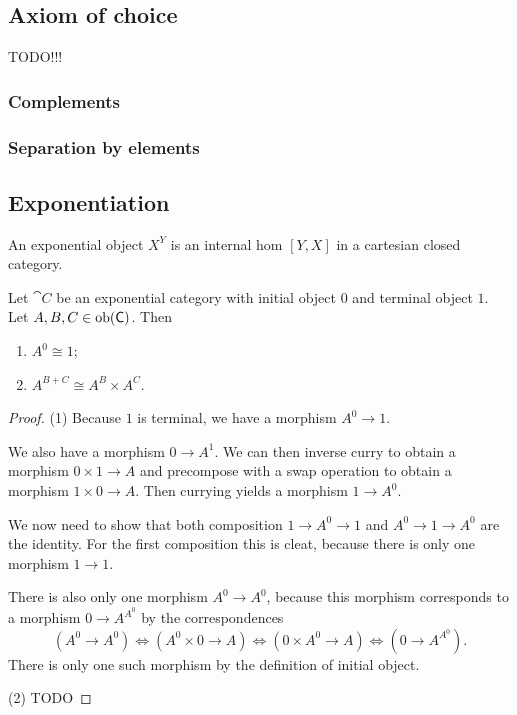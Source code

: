 \subsection{Axiom of choice}
TODO!!!
\subsubsection{Complements}
\subsubsection{Separation by elements}

\subsection{Exponentiation}
\begin{definition}
An exponential object $X^Y$ is an internal hom $[Y,X]$ in a cartesian closed category.
\end{definition}

\begin{proposition}
Let $\cat{C}$ be an exponential category with initial object $0$ and terminal object $1$. Let $A,B,C\in \operatorname{ob}(\mathsf{C})$. Then
\begin{enumerate}
\item $A^0 \cong 1$;
\item $A^{B + C} \cong A^B \times A^C$.
\end{enumerate}
\end{proposition}
\begin{proof}
(1) Because $1$ is terminal, we have a morphism $A^0\to 1$.

We also have a morphism $0 \to A^1$. We can then inverse curry to obtain a morphism $0\times 1 \to A$ and precompose with a swap operation to obtain a morphism $1\times 0 \to A$. Then currying yields a morphism $1 \to A^0$.

We now need to show that both composition $1\to A^0 \to 1$ and $A^0\to 1 \to A^0$ are the identity. For the first composition this is cleat, because there is only one morphism $1\to 1$.

There is also only one morphism $A^0\to A^0$, because this morphism corresponds to a morphism $0\to A^{A^0}$ by the correspondences
\[ (A^0 \to A^0) \iff (A^0\times 0 \to A) \iff (0\times A^0\to A) \iff (0\to A^{A^0}). \]
There is only one such morphism by the definition of initial object.

(2) TODO
\end{proof}


